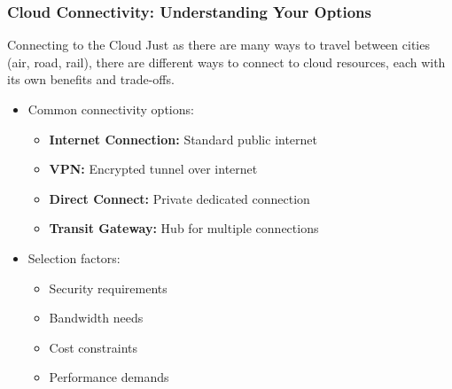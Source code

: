 \documentclass{beamer}
\begin{document}
\begin{frame}
    \frametitle{Cloud Connectivity: Understanding Your Options}
    
    \begin{block}{Connecting to the Cloud}
        Just as there are many ways to travel between cities (air, road, rail), there are different ways to connect to cloud resources, each with its own benefits and trade-offs.
    \end{block}
    
    \begin{itemize}
        \item Common connectivity options:
        \begin{itemize}
            \item \textbf{Internet Connection:} Standard public internet
            \item \textbf{VPN:} Encrypted tunnel over internet
            \item \textbf{Direct Connect:} Private dedicated connection
            \item \textbf{Transit Gateway:} Hub for multiple connections
        \end{itemize}
        
        \item Selection factors:
        \begin{itemize}
            \item Security requirements
            \item Bandwidth needs
            \item Cost constraints
            \item Performance demands
        \end{itemize}
    \end{itemize}
\end{frame}
\end{document}
